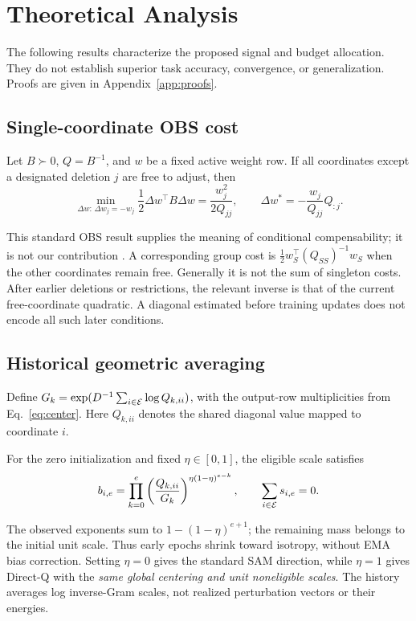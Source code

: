 \section{Theoretical Analysis}
\label{sec:theory}
The following results characterize the proposed signal and budget allocation. They do not establish superior task accuracy, convergence, or generalization. Proofs are given in Appendix~\ref{app:proofs}.

\subsection{Single-coordinate OBS cost}
\begin{proposition}
\label{prop:obs}
Let $B\succ0$, $Q=B^{-1}$, and $w$ be a fixed active weight row. If all coordinates except a designated deletion $j$ are free to adjust, then
\begin{equation}
 \min_{\Delta w:\,\Delta w_j=-w_j}\frac12\Delta w^\top B\Delta w
 =\frac{w_j^2}{2Q_{jj}},\qquad
 \Delta w^*=-\frac{w_j}{Q_{jj}}Q_{:j}.
\end{equation}
\end{proposition}
This standard OBS result supplies the meaning of conditional compensability; it is not our contribution \cite{obc}. A corresponding group cost is $\frac12w_S^\top(Q_{SS})^{-1}w_S$ when the other coordinates remain free. Generally it is not the sum of singleton costs. After earlier deletions or restrictions, the relevant inverse is that of the current free-coordinate quadratic. A diagonal estimated before training updates does not encode all such later conditions.

\subsection{Historical geometric averaging}
Define $G_k=\exp(D^{-1}\sum_{i\in\mathcal{E}}\log Q_{k,ii})$, with the output-row multiplicities from Eq.~\eqref{eq:center}. Here $Q_{k,ii}$ denotes the shared diagonal value mapped to coordinate $i$.
\begin{proposition}
\label{prop:history}
For the zero initialization and fixed $\eta\in[0,1]$, the eligible scale satisfies
\begin{equation}
 b_{i,e}=\prod_{k=0}^{e}\left(\frac{Q_{k,ii}}{G_k}\right)^{\eta(1-\eta)^{e-k}},
 \qquad \sum_{i\in\mathcal{E}}s_{i,e}=0.
 \label{eq:product}
\end{equation}
\end{proposition}
The observed exponents sum to $1-(1-\eta)^{e+1}$; the remaining mass belongs to the initial unit scale. Thus early epochs shrink toward isotropy, without EMA bias correction. Setting $\eta=0$ gives the standard SAM direction, while $\eta=1$ gives Direct-Q with the \emph{same global centering and unit noneligible scales}. The history averages log inverse-Gram scales, not realized perturbation vectors or their energies.

